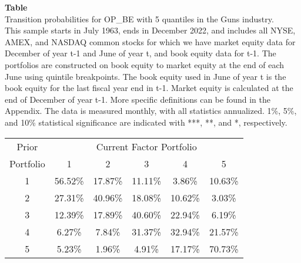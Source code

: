 \begin{table*}[ht!]
\raggedright
{}
\label{tab: transition_probs_OP_BE_Guns_with_5_quantiles}
\textbf{Table \thetable} \\
Transition probabilities for OP_BE with 5 quantiles in the Guns industry. \\
\hspace*{1em}This sample starts in July 1963, ends in December 2022, and includes all NYSE, AMEX, and NASDAQ common stocks for which we have market equity data for December of year t-1 and June of year t, and book equity data for t-1. The portfolios are constructed on book equity to market equity at the end of each June using quintile breakpoints.  The book equity used in June of year t is the book equity for the last fiscal year end in t-1.  Market equity is calculated at the end of December of year t-1.  More specific definitions can be found in the Appendix.  The data is measured monthly, with all statistics annualized.  1\%, 5\%, and 10\% statistical significance are indicated with ***, **, and *, respectively. \\
\vspace{0.5em}
\centering
\begin{adjustbox}{max width=\textwidth}
\begin{tabular}{@{}cccccc@{}}
\toprule
Prior & \multicolumn{5}{c}{Current Factor Portfolio} \\
Portfolio & 1 & 2 & 3 & 4 & 5 \\
\midrule
1 & 56.52\% & 17.87\% & 11.11\% & 3.86\% & 10.63\% \\
2 & 27.31\% & 40.96\% & 18.08\% & 10.62\% & 3.03\% \\
3 & 12.39\% & 17.89\% & 40.60\% & 22.94\% & 6.19\% \\
4 & 6.27\% & 7.84\% & 31.37\% & 32.94\% & 21.57\% \\
5 & 5.23\% & 1.96\% & 4.91\% & 17.17\% & 70.73\% \\
\bottomrule
\end{tabular}
\end{adjustbox}
\end{table*}